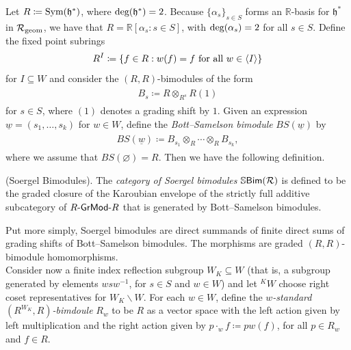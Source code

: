 \noindent Let $R \coloneqq \textup{Sym}(\mathfrak{h}^*)$, where $\textup{deg}(\mathfrak{h}^*) = 2$. Because $\{\alpha_s\}_{s \in S}$ forms an $\mathbb{R}$-basis for $\mathfrak{h}^*$ in $\mathcal{R}_\textup{geom}$, we have that $R = \mathbb{R}[\alpha_s : s \in S]$, with $\textup{deg}(\alpha_s) = 2$ for all $s \in S$. Define the fixed point subrings
\begin{align*}
\begin{split}
R^I \coloneqq \{f \in R : w(f) = f\textup{ for all $w \in \langle I\rangle$}\}
\end{split}
\end{align*}
\noindent for $I \subseteq W$ and consider the $(R, R)$-bimodules of the form
\begin{align*}
\begin{split}
B_s \coloneqq R \otimes_{R^s} R(1)
\end{split}
\end{align*}
\noindent for $s \in S$, where $(1)$ denotes a grading shift by $1$. Given an expression $\underline{w} = (s_1, \dots, s_k)$ for $w \in W$, define the {\em Bott--Samelson bimodule} $BS(\underline{w})$ by
\begin{align*}
\begin{split}
BS(\underline{w}) \coloneqq B_{s_1} \otimes_R \cdots \otimes_R B_{s_k},
\end{split}
\end{align*}
\noindent where we assume that $BS(\varnothing) = R$. 
Then we have the following definition.\\

\noindent\begin{definition}\textup{(Soergel Bimodules).} The {\em category of Soergel bimodules} $\mathbb{S}\textup{\textsf{Bim}}(\mathcal{R})$ is defined to be the graded closure of the Karoubian envelope of the strictly full additive subcategory of $R\textup{\textsf{-GrMod-}}R$ that is generated by Bott--Samelson bimodules.\\
\end{definition}

\noindent Put more simply, Soergel bimodules are direct summands of finite direct sums of grading shifts of Bott--Samelson bimodules. The morphisms are graded $(R, R)$-bimodule homomorphisms.\\

\noindent Consider now a finite index reflection subgroup $W_K \subseteq W$ (that is, a subgroup generated by elements $wsw^{-1}$, for $s \in S$ and $w \in W$) and let ${}^KW$ choose right coset representatives for $W_K\backslash W$. For each $w \in W$, define the {\em $w$-standard $(R^{W_K}, R)$-bimdoule} $R_w$ to be $R$ as a vector space with the left action given by left multiplication and the right action given by $p \cdot_w f \coloneqq p w(f)$, for all $p \in R_w$ and $f \in R$.\\

